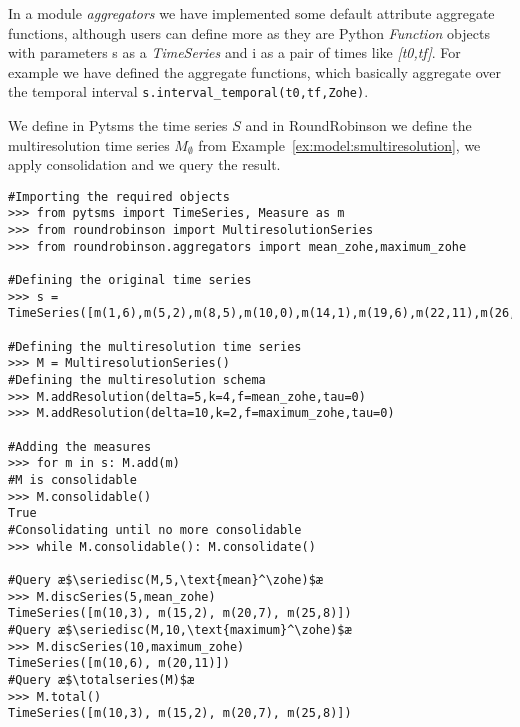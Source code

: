 In a module \emph{aggregators} we have implemented some default
attribute aggregate functions, although users can define more as they
are Python \emph{Function} objects with parameters s as a \emph{TimeSeries} and i as
a pair of times like \emph{[t0,tf]}. For example we have defined the \zohe
aggregate functions, which basically aggregate over the temporal
interval \lstinline[style=py]+s.interval_temporal(t0,tf,Zohe)+.


\begin{example}
  We define in Pytsms the time series $S$ and in RoundRobinson we
  define the multiresolution time series $M_\emptyset$ from
  Example~\ref{ex:model:smultiresolution}, we apply consolidation and
  we query the result.

\begin{lstlisting}[style=py]
#Importing the required objects
>>> from pytsms import TimeSeries, Measure as m
>>> from roundrobinson import MultiresolutionSeries
>>> from roundrobinson.aggregators import mean_zohe,maximum_zohe

#Defining the original time series
>>> s = TimeSeries([m(1,6),m(5,2),m(8,5),m(10,0),m(14,1),m(19,6),m(22,11),m(26,6),m(29,0)])

#Defining the multiresolution time series
>>> M = MultiresolutionSeries()
#Defining the multiresolution schema
>>> M.addResolution(delta=5,k=4,f=mean_zohe,tau=0)
>>> M.addResolution(delta=10,k=2,f=maximum_zohe,tau=0)

#Adding the measures
>>> for m in s: M.add(m)
#M is consolidable
>>> M.consolidable()
True
#Consolidating until no more consolidable
>>> while M.consolidable(): M.consolidate()

#Query æ$\seriedisc(M,5,\text{mean}^\zohe)$æ
>>> M.discSeries(5,mean_zohe)
TimeSeries([m(10,3), m(15,2), m(20,7), m(25,8)])
#Query æ$\seriedisc(M,10,\text{maximum}^\zohe)$æ
>>> M.discSeries(10,maximum_zohe)
TimeSeries([m(10,6), m(20,11)])
#Query æ$\totalseries(M)$æ
>>> M.total()
TimeSeries([m(10,3), m(15,2), m(20,7), m(25,8)])
\end{lstlisting}
\end{example}



